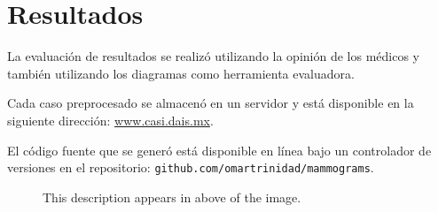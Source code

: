 \chapter{Resultados}
\label{resultados}

La evaluación de resultados se realizó utilizando la opinión de los médicos y 
también utilizando los diagramas como herramienta evaluadora.

Cada caso preprocesado se almacenó en un servidor y está disponible en la siguiente
dirección: \url{www.casi.dais.mx}.

El código fuente que se generó está disponible en línea bajo un controlador de
versiones en el repositorio: \texttt{github.com/omartrinidad/mammograms}.

\begin{figure}[h!]
  \begin{center}
    \hspace{\fill}
    \hfill
    \hspace{\fill}
  \caption[Compressed 8-bits mammogram and histogram]{This description appears 
  in above of the image.}
  \end{center}
  \label{8bits} 
\end{figure}


